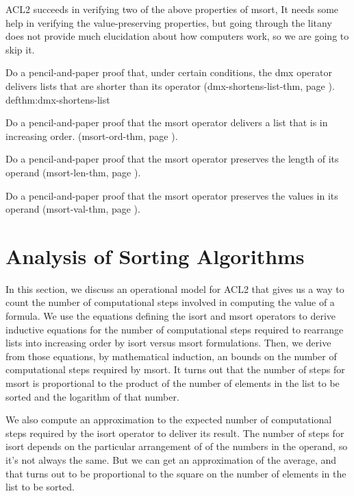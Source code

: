 ACL2 succeeds in verifying two of the above properties of msort,
It needs some help in verifying the value-preserving
properties, but going through the litany does not provide
much elucidation about how computers work, so we are going to skip it.

\begin{ExerciseList}
\Exercise
Do a pencil-and-paper proof that, under certain conditions, the dmx operator
delivers lists that are shorter than its operator
(dmx-shortens-list-thm, page \pageref{defthm:dmx-shortens-list}).
{defthm:dmx-shortens-list}

Do a pencil-and-paper proof that the msort operator
delivers a list that is in increasing order.
(msort-ord-thm, page \pageref{defthm:msort-ord}).

Do a pencil-and-paper proof that the msort operator
preserves the length of its operand
(msort-len-thm, page \pageref{defthm:msort-len}).

Do a pencil-and-paper proof that the msort operator
preserves the values in its operand
(msort-val-thm, page \pageref{defthm:msort-val}).
\end{ExerciseList}

\section{Analysis of Sorting Algorithms}
\label{sec:sort-analysis}

In this section, we discuss an operational model for ACL2
that gives us a way to count the number of computational steps involved
in computing the value of a formula. We use the equations defining
the isort and msort operators to derive inductive equations
for the number of computational steps required to rearrange lists
into increasing order by isort versus msort formulations.
Then, we derive from those equations, by mathematical induction,
an bounds on the number of computational steps required by msort.
It turns out that the number of steps for msort 
is proportional to the product of
the number of elements in the list to be sorted 
and the logarithm of that number.

We also compute an approximation to the expected number of computational steps
required by the isort operator to deliver its result.
The number of steps for isort depends on the particular arrangement of
of the numbers in the operand, so it's not always the same.
But we can get an approximation of the average, and that turns out to
be proportional to the square on the number of elements in the list to be sorted.